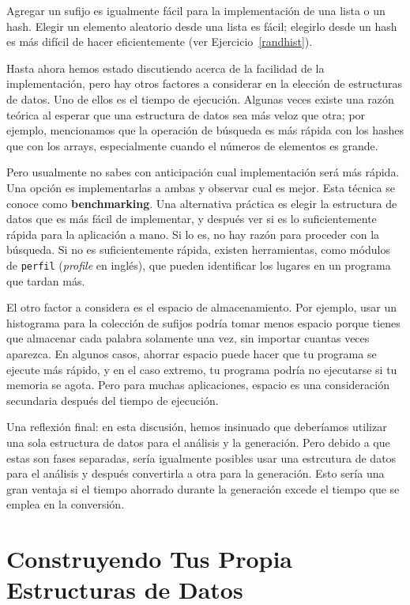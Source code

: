 Agregar un sufijo es igualmente fácil para la implementación de una lista
o un hash. Elegir un elemento aleatorio desde una lista es fácil; elegirlo
desde un hash es más difícil de hacer eficientemente (ver Ejercicio~\ref{randhist}).

Hasta ahora hemos estado discutiendo acerca de la facilidad de la implementación,
pero hay otros factores a considerar en la elección de estructuras de datos.
Uno de ellos es el tiempo de ejecución. Algunas veces existe una razón teórica 
al esperar que una estructura de datos sea más veloz que otra; por ejemplo,
mencionamos que la operación de búsqueda es más rápida con los hashes que con los
arrays, especialmente cuando el números de elementos es grande.

Pero usualmente no sabes con anticipación cual implementación será más rápida.
Una opción es implementarlas a ambas y observar cual es mejor. Esta técnica se
conoce como {\bf benchmarking}. Una alternativa práctica es elegir la estructura 
de datos que es más fácil de implementar, y después ver si es lo suficientemente
rápida para la aplicación a mano. Si lo es, no hay razón para proceder con
la búsqueda. Si no es suficientemente rápida, existen herramientas, como módulos
de {\tt perfil} (\emph{profile} en inglés), que pueden identificar los lugares
en un programa que tardan más.

El otro factor a considera es el espacio de almacenamiento. Por ejemplo,  
usar un histograma para la colección de sufijos podría tomar menos espacio
porque tienes que almacenar cada palabra solamente una vez, sin importar 
cuantas veces aparezca. En algunos casos, ahorrar espacio puede hacer
que tu programa se ejecute más rápido, y en el caso extremo, tu programa
podría no ejecutarse si tu memoria se agota. Pero para muchas aplicaciones,
espacio es una consideración secundaria después del tiempo de ejecución.

Una reflexión final: en esta discusión, hemos insinuado que deberíamos utilizar
una sola estructura de datos para el análisis y la generación. Pero debido a que
estas son fases separadas, sería igualmente posibles usar una estrcutura de datos
para el análisis y después convertirla a otra para la generación. Esto sería
una gran ventaja si el tiempo ahorrado durante la generación excede el tiempo
que se emplea en la conversión.

\section{Construyendo Tus Propia Estructuras de Datos}

